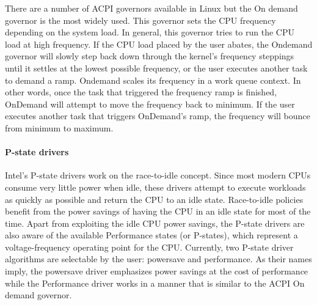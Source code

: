 There are a number of ACPI governors available in Linux but the On demand governor is the most widely used.
This governor sets the CPU frequency depending on the system load.  
In general, this governor tries to run the CPU load at high frequency. If the CPU load placed by the user abates, the Ondemand governor will slowly 
step back down through the kernel's frequency steppings until it settles at the lowest possible frequency, or the user executes another task to demand a ramp.
Ondemand scales its frequency in a work queue context. In other words, once the task that triggered the frequency ramp is finished, 
OnDemand will attempt to move the frequency back to minimum. If the user executes another task that triggers OnDemand's ramp, the frequency will bounce from minimum to maximum.

\paragraph{P-state drivers}
Intel's P-state drivers work on the race-to-idle concept. Since most modern CPUs consume very little power when idle, these drivers attempt to execute workloads as quickly 
as possible and return the CPU to an idle state. Race-to-idle policies benefit from the power savings of having the CPU in an idle state for most of the time. Apart from 
exploiting the idle CPU power savings, the P-state drivers are also aware of the available Performance states (or P-states), which represent a voltage-frequency operating point for the CPU. 
Currently, two P-state driver algorithms are selectable by the user: powersave and performance. As their names imply, the powersave driver emphasizes power savings at the cost of 
performance while the Performance driver works in a manner that is similar to the ACPI On demand governor.
 
